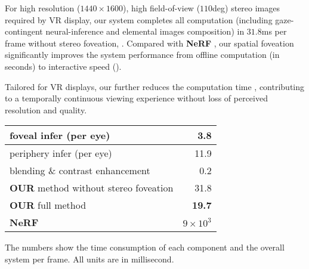 For high resolution ($1440\times1600$), high field-of-view ($110$deg) stereo images required by VR display, our system completes all computation (including gaze-contingent neural-inference and elemental images composition) in $31.8$ms per frame without stereo foveation, . Compared with {\bf NeRF} , our spatial foveation  significantly improves the system performance from offline computation (in seconds) to interactive speed ().

Tailored for VR displays, our  further reduces the computation time , contributing to a temporally continuous viewing experience without loss of perceived resolution and quality.

\begin{table}[!htb]
    \centering
    \begin{tabular}{ l|r } 
        \toprule
         foveal infer (per eye)  & 3.8 \\
         \midrule
         periphery infer (per eye) & 11.9 \\
          \midrule
         blending \& contrast enhancement & 0.2 \\
          \midrule\midrule
         {\bf OUR} method without stereo foveation & 31.8\\
         {\bf OUR} full method & {\bf 19.7}\\
         \midrule
         {\bf NeRF} \cite{mildenhall2020nerf} & $9\times10^3$ \\
         \bottomrule
    \end{tabular}
    {%
    The numbers show the time consumption of each component and the overall system per frame. All units are in millisecond.
    }
    \label{tbl:ablation}
\end{table}

